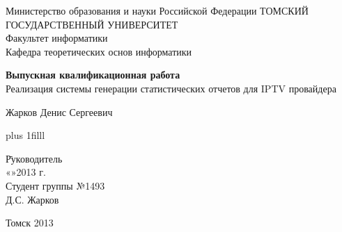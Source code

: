
\thispagestyle{empty}
\begin{center}
Министерство образования и науки Российской Федерации
ТОМСКИЙ ГОСУДАРСТВЕННЫЙ УНИВЕРСИТЕТ\\
Факультет информатики\\
Кафедра теоретических основ информатики\\
\end{center}

\vspace{2cm}

\begin{center}



\vspace{1cm}
{\bf Выпускная квалификационная работа}\\
\vspace{0.5cm}
Реализация системы генерации статистических отчетов для IPTV провайдера
\vspace{1.0cm}

Жарков Денис Сергеевич


\end{center}

\vskip 0pt plus 1filll

\begin{tabbing}
\hspace{10cm}\=Руководитель\\
\>«\makebox[0.8cm]{\hrulefill}»\makebox[1.5cm]{\hrulefill}2013 г.\\
\>Студент группы №1493\\
\>\makebox[3cm]{\hrulefill}Д.С. Жарков\\
\end{tabbing}

\vspace*{1cm}

\begin{center}
Томск 2013
\end{center}

